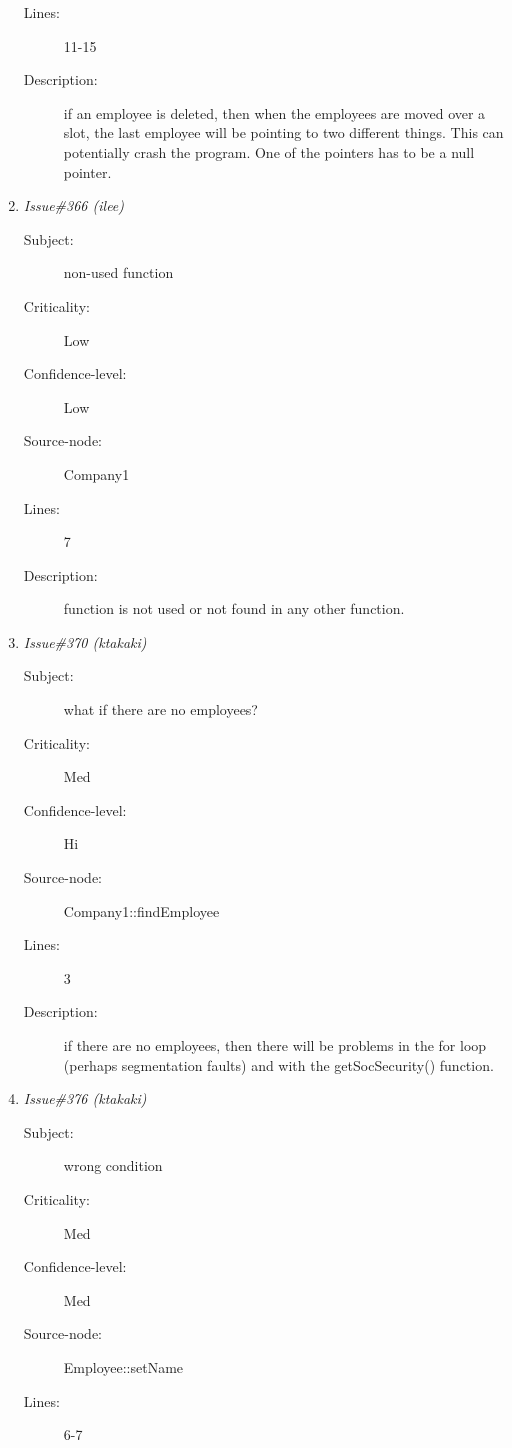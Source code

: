 \begin{enumerate}
\begin{description}
\item [Lines:] 11-15

\item [Description:] if an employee is deleted, then when the
employees are moved over a slot, the last employee will be pointing to two
different things.  This can potentially crash the program.  One of the
pointers has to be a null pointer.
\end{description}
\item {\it Issue\#366 (ilee)}
\begin{description}
\item [Subject:] non-used function
\item [Criticality:] Low
\item [Confidence-level:] Low
\item [Source-node:] Company1

\item [Lines:] 7

\item [Description:] function is not used or not found in any other
function.
\end{description}
\item {\it Issue\#370 (ktakaki)}
\begin{description}
\item [Subject:] what if there are no employees?
\item [Criticality:] Med
\item [Confidence-level:] Hi
\item [Source-node:] Company1::findEmployee

\item [Lines:] 3

\item [Description:] if there are no employees, then there will 
be problems in the for loop (perhaps segmentation faults) and with the
getSocSecurity() function.
\end{description}
\item {\it Issue\#376 (ktakaki)}
\begin{description}
\item [Subject:] wrong condition
\item [Criticality:] Med
\item [Confidence-level:] Med
\item [Source-node:] Employee::setName

\item [Lines:] 6-7


\end{description}
\end{enumerate}
